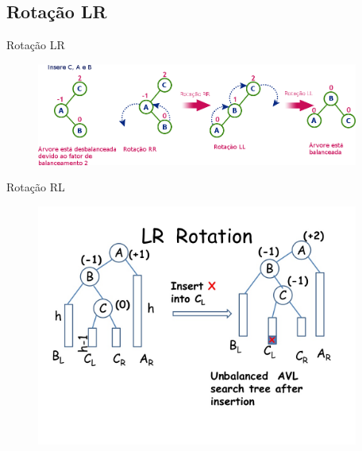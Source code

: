 \documentclass[aspectratio=169]{beamer}
\begin{document}
\subsection{Rotação LR}

\begin{frame}{Rotação LR}
\begin{figure}[!h]
  \centering
   \includegraphics[width=300pt]{imagens/rotacao_lr.png}
  \label{fig_rotacao_lr}
\end{figure}
\end{frame}

\begin{frame}{Rotação RL}
\begin{figure}[!h]
  \centering
  \includegraphics[width=300pt]{imagens/lr_rotation.png}
  \label{fig_lr_rotation}
\end{figure}
\end{frame}

\end{document}
